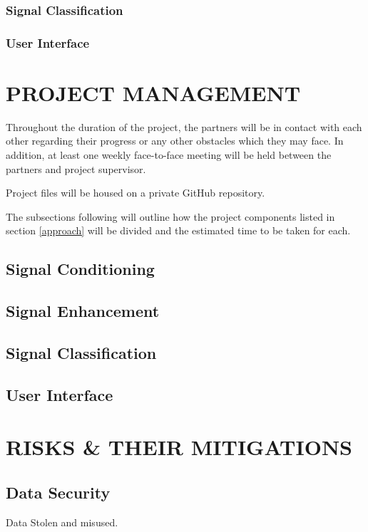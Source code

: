 \documentclass[10pt,twocolumn]{witseiepaper}
\begin{document}
\subsubsection{Signal Classification}

\subsubsection{User Interface}

\section{PROJECT MANAGEMENT} %
Throughout the duration of the project, the partners will be in contact with each other regarding their progress or any other obstacles which they may face. In addition, at least one weekly face-to-face meeting will be held between the partners and project supervisor.

Project files will be housed on a private GitHub repository.

The subsections following will outline how the project components listed in section \ref{approach} will be divided and the estimated time to be taken for each.

\subsection{Signal Conditioning}

\subsection{Signal Enhancement}

\subsection{Signal Classification}

\subsection{User Interface}

\section{RISKS \& THEIR MITIGATIONS} %
\subsection{Data Security}
Data Stolen and misused.
\end{document}
